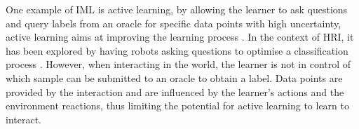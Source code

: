 \documentclass[manuscript, review, anonymous]{acmart}
\newcommand{\ES}[1]{\added[id=ES]{#1}}
\newcommand{\SL}[1]{\added[id=SL]{#1}}
\newcommand{\woz}{WoZ++\xspace}
\begin{document}

One example of IML is active learning, by allowing the learner to ask questions
and query labels from an oracle for specific data points with high uncertainty,
active learning aims at improving the learning process \cite{settles2012active}.
In the context of HRI, it has been explored by having robots asking questions to
optimise a classification process \cite{chao2010transparent}. However, when
interacting in the world, the learner is not in control of which sample can be
submitted to an oracle to obtain a label. Data points are provided by the
interaction and are influenced by the learner's actions and the environment
reactions, thus limiting the potential for active learning to learn to interact. 


\end{document}

